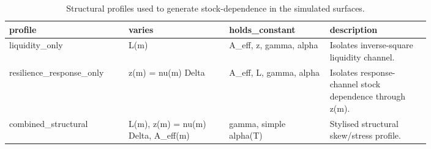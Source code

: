 \documentclass{article}
\begin{document}
\begin{table}[ht]
\centering
\caption{Structural profiles used to generate stock-dependence in the simulated surfaces.}
\label{tab:profile-definitions-v1}
\begin{tabular}{p{0.20\linewidth}p{0.20\linewidth}p{0.20\linewidth}p{0.20\linewidth}}
\toprule
profile & varies & holds\_constant & description \\
\midrule
liquidity\_only & L(m) & A\_eff, z, gamma, alpha & Isolates inverse-square liquidity channel. \\
resilience\_response\_only & z(m) = nu(m) Delta & A\_eff, L, gamma, alpha & Isolates response-channel stock dependence through z(m). \\
combined\_structural & L(m), z(m) = nu(m) Delta, A\_eff(m) & gamma, simple alpha(T) & Stylised structural skew/stress profile. \\
\bottomrule
\end{tabular}
\end{table}
\end{document}
